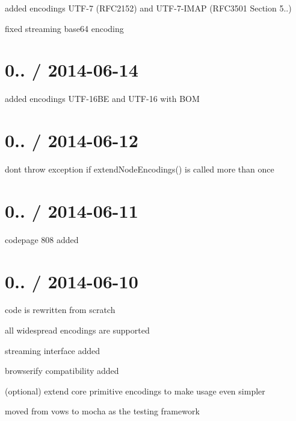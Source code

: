 \begin{DoxyItemize}
\item added encodings U\+T\+F-\/7 (R\+F\+C2152) and U\+T\+F-\/7-\/\+I\+M\+AP (R\+F\+C3501 Section 5..)
\item fixed streaming base64 encoding
\end{DoxyItemize}

\section*{0.. / 2014-\/06-\/14}


\begin{DoxyItemize}
\item added encodings U\+T\+F-\/16\+BE and U\+T\+F-\/16 with B\+OM
\end{DoxyItemize}

\section*{0.. / 2014-\/06-\/12}


\begin{DoxyItemize}
\item don\textquotesingle{}t throw exception if {\ttfamily extend\+Node\+Encodings()} is called more than once
\end{DoxyItemize}

\section*{0.. / 2014-\/06-\/11}


\begin{DoxyItemize}
\item codepage 808 added
\end{DoxyItemize}

\section*{0.. / 2014-\/06-\/10}


\begin{DoxyItemize}
\item code is rewritten from scratch
\item all widespread encodings are supported
\item streaming interface added
\item browserify compatibility added
\item (optional) extend core primitive encodings to make usage even simpler
\item moved from vows to mocha as the testing framework 
\end{DoxyItemize}